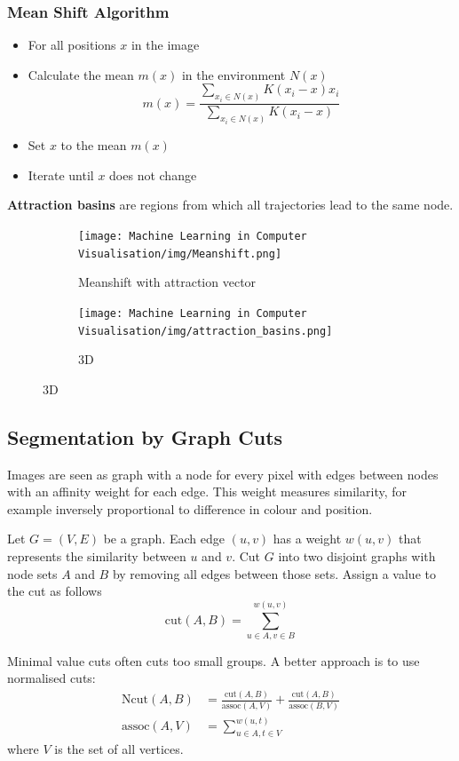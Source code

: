 \documentclass[x11names,11pt,a4paper]{article}
\theoremstyle{definition}
\begin{document}
\subsubsection{Mean Shift Algorithm}
\begin{itemize}[label=-]
	\item[] For all positions $x$ in the image
	\item Calculate the mean $m(x)$ in the environment $N(x)$
	\begin{equation*}
		m(x) = \frac{\sum_{x_i \in N(x)} K(x_i - x) x_i }{\sum_{x_i \in N(x)} K(x_i - x)}
	\end{equation*}
	\item Set $x$ to the mean $m(x)$
	\item Iterate until $x$ does not change
\end{itemize}
\textbf{Attraction basins} are regions from which all trajectories lead to the same node.

\begin{figure}[H]
     \centering
     \begin{subfigure}[b]{0.45\textwidth}
         \centering
         \texttt{[image: Machine Learning in Computer Visualisation/img/Meanshift.png]}
         \caption{Meanshift with attraction vector}
     \end{subfigure}
     \hfill
     \begin{subfigure}[b]{0.45\textwidth}
         \centering
         \texttt{[image: Machine Learning in Computer Visualisation/img/attraction\_basins.png]}
         \caption{3D}
     \end{subfigure}
\end{figure}



\subsection{Segmentation by Graph Cuts}
Images are seen as graph with a node for every pixel with edges between nodes with an affinity weight for each edge. This weight  measures similarity, for example inversely proportional to difference in colour and position.
\begin{definition}
	Let $G=(V,E)$ be a graph. Each edge $(u,v)$ has a weight $w(u,v)$ that represents the similarity between $u$ and $v$. Cut $G$ into two disjoint graphs with node sets $A$ and $B$ by removing all edges between those sets. Assign a value to the cut as follows
	\begin{equation*}
		\text{cut}(A,B) = \sum_{u\in A,v\in B}^{w(u,v)}
	\end{equation*}
\end{definition}
Minimal value cuts often cuts too small groups. A better approach is to use normalised cuts:
\begin{align*}
	\text{Ncut}(A,B) &= \frac{\text{cut}(A,B)}{\text{assoc}(A,V)} + \frac{\text{cut}(A,B)}{\text{assoc}(B,V)}\\
	\text{assoc}(A,V) &= \sum_{u\in A, t\in V}^{w(u,t)}
\end{align*}
where $V$ is the set of all vertices.
\end{document}
